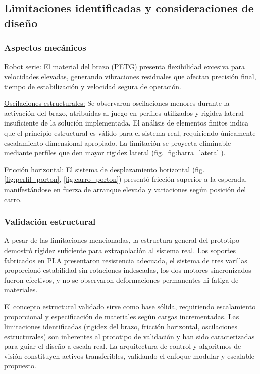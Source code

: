 \subsection{Limitaciones identificadas y consideraciones de diseño}

\subsubsection{Aspectos mecánicos}

\underline{Robot serie:} El material del brazo (PETG) presenta flexibilidad excesiva para velocidades elevadas, generando vibraciones residuales que afectan precisión final, tiempo de estabilización y velocidad segura de operación.

\underline{Oscilaciones estructurales:} Se observaron oscilaciones menores durante la activación del brazo, atribuidas al juego en perfiles utilizados y rigidez lateral insuficiente de la solución implementada. El análisis de elementos finitos indica que el principio estructural es válido para el sistema real, requiriendo únicamente escalamiento dimensional apropiado. La limitación se proyecta eliminable mediante perfiles que den mayor rigidez lateral (fig. \ref{fig:barra_lateral}).

\underline{Fricción horizontal:} El sistema de desplazamiento horizontal (fig. \ref{fig:perfil_porton}, \ref{fig:carro_porton}) presentó fricción superior a la esperada, manifestándose en fuerza de arranque elevada y variaciones según posición del carro.

\subsubsection{Validación estructural}

A pesar de las limitaciones mencionadas, la estructura general del prototipo demostró rigidez suficiente para extrapolación al sistema real. Los soportes fabricados en PLA presentaron resistencia adecuada, el sistema de tres varillas proporcionó estabilidad sin rotaciones indeseadas, los dos motores sincronizados fueron efectivos, y no se observaron deformaciones permanentes ni fatiga de materiales.

El concepto estructural validado sirve como base sólida, requiriendo escalamiento proporcional y especificación de materiales según cargas incrementadas. Las limitaciones identificadas (rigidez del brazo, fricción horizontal, oscilaciones estructurales) son inherentes al prototipo de validación y han sido caracterizadas para guiar el diseño a escala real. La arquitectura de control y algoritmos de visión constituyen activos transferibles, validando el enfoque modular y escalable propuesto.
